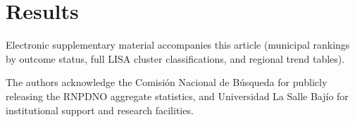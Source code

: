 \documentclass[pdflatex,sn-mathphys-num]{sn-jnl}
\begin{document}
\maketitle



\section{Results}\label{sec:results}











\backmatter

Electronic supplementary material accompanies this article 
(municipal rankings by outcome status, full LISA cluster 
classifications, and regional trend tables).

The authors acknowledge the Comisi\'{o}n Nacional de B\'{u}squeda 
for publicly releasing the RNPDNO aggregate statistics, and 
Universidad La Salle Baj\'{i}o for institutional support and 
research facilities.
\end{document}
